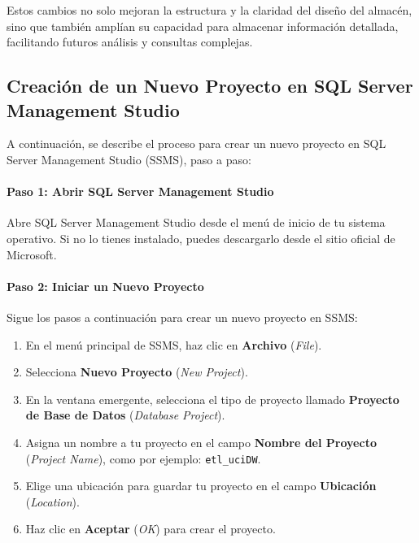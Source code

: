 \documentclass{article}
\begin{document}
	Estos cambios no solo mejoran la estructura y la claridad del diseño del almacén, sino que también amplían su capacidad para almacenar información detallada, facilitando futuros análisis y consultas complejas.
	
	
	\subsection{Creación de un Nuevo Proyecto en SQL Server Management Studio}
	
	A continuación, se describe el proceso para crear un nuevo proyecto en SQL Server Management Studio (SSMS), paso a paso:
	
	\paragraph{Paso 1: Abrir SQL Server Management Studio}  
	Abre SQL Server Management Studio desde el menú de inicio de tu sistema operativo. Si no lo tienes instalado, puedes descargarlo desde el sitio oficial de Microsoft.
	
	\paragraph{Paso 2: Iniciar un Nuevo Proyecto}  
	Sigue los pasos a continuación para crear un nuevo proyecto en SSMS:
	\begin{enumerate}
		\item En el menú principal de SSMS, haz clic en \textbf{Archivo} (\textit{File}).
		\item Selecciona \textbf{Nuevo Proyecto} (\textit{New Project}).
		\item En la ventana emergente, selecciona el tipo de proyecto llamado \textbf{Proyecto de Base de Datos} (\textit{Database Project}).
		\item Asigna un nombre a tu proyecto en el campo \textbf{Nombre del Proyecto} (\textit{Project Name}), como por ejemplo: \texttt{etl\_uciDW}.
		\item Elige una ubicación para guardar tu proyecto en el campo \textbf{Ubicación} (\textit{Location}).
		\item Haz clic en \textbf{Aceptar} (\textit{OK}) para crear el proyecto.
	\end{enumerate}
	
\end{document}
